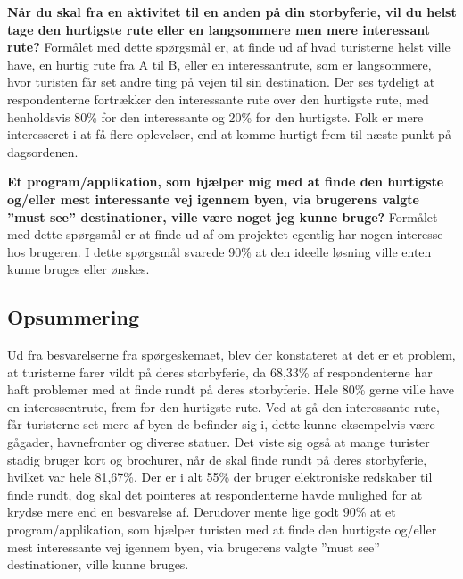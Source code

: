 \textbf{Når du skal fra en aktivitet til en anden på din storbyferie, vil du helst tage den hurtigste rute eller en langsommere men mere interessant rute?}\newline 
Formålet med dette spørgsmål er, at finde ud af hvad turisterne helst ville have, en hurtig rute fra A til B, eller en interessantrute, som er langsommere, hvor turisten får set andre ting på vejen til sin destination.\newline
Der ses tydeligt at respondenterne fortrækker den interessante rute over den hurtigste rute, med henholdsvis 80\% for den interessante og 20\% for den hurtigste. Folk er mere interesseret i at få flere oplevelser, end at komme hurtigt frem til næste punkt på dagsordenen.\newline

\textbf{Et program/applikation, som hjælper mig med at finde den hurtigste og/eller mest interessante vej igennem byen, via brugerens valgte ”must see” destinationer, ville være noget jeg kunne bruge?}\newline
Formålet med dette spørgsmål er at finde ud af om projektet egentlig har nogen interesse hos brugeren.\newline  
I dette spørgsmål svarede 90\% at den ideelle løsning ville enten kunne bruges eller ønskes.\newline
\subsection{Opsummering}
Ud fra besvarelserne fra spørgeskemaet, blev der konstateret at det er et problem, at turisterne farer vildt på deres storbyferie, da 68,33\% af respondenterne har haft problemer med at finde rundt på deres storbyferie. Hele 80\% gerne ville have en interessentrute, frem for den hurtigste rute. Ved at gå den interessante rute, får turisterne set mere af byen de befinder sig i, dette kunne eksempelvis være gågader, havnefronter og diverse statuer. Det viste sig også at mange turister stadig bruger kort og brochurer, når de skal finde rundt på deres storbyferie, hvilket var hele 81,67\%. Der er i alt 55\% der bruger elektroniske redskaber til finde rundt, dog skal det pointeres at respondenterne havde mulighed for at krydse mere end en besvarelse af. Derudover mente lige godt 90\% at et program/applikation, som hjælper turisten med at finde den hurtigste og/eller mest interessante vej igennem byen, via brugerens valgte ”must see” destinationer, ville kunne bruges.